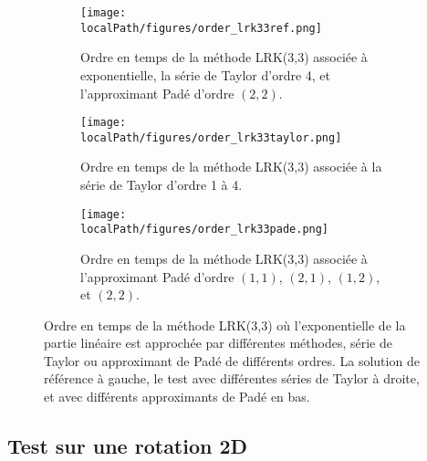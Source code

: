 \begin{figure}
  \centering
  \begin{subfigure}{.45\textwidth}
    \centering
    \texttt{[image: \\localPath/figures/order\_lrk33ref.png]}
    \caption{Ordre en temps de la méthode LRK(3,3) associée à exponentielle, la série de Taylor d'ordre 4, et l'approximant Padé d'ordre $(2,2)$.}
    \label{fig:lrk33ref}
  \end{subfigure}
  \begin{subfigure}{.45\textwidth}
    \centering
    \texttt{[image: \\localPath/figures/order\_lrk33taylor.png]}
    \caption{Ordre en temps de la méthode LRK(3,3) associée à la série de Taylor d'ordre 1 à 4.\\ }
    \label{fig:lrk33taylor}
  \end{subfigure}
  \begin{subfigure}{.45\textwidth}
    \centering
    \texttt{[image: \\localPath/figures/order\_lrk33pade.png]}
    \caption{Ordre en temps de la méthode LRK(3,3) associée à l'approximant Padé d'ordre $(1,1)$, $(2,1)$, $(1,2)$, et $(2,2)$.}
    \label{fig:lrk33pade}
  \end{subfigure}
  \caption{Ordre en temps de la méthode LRK(3,3) où l'exponentielle de la partie linéaire est approchée par différentes méthodes, série de Taylor ou approximant de Padé de différents ordres. La solution de référence à gauche, le test avec différentes séries de Taylor à droite, et avec différents approximants de Padé en bas.}
  \label{fig:3:order}
\end{figure}

\subsection{Test sur une rotation 2D}

